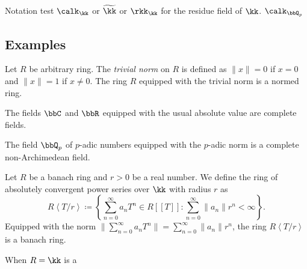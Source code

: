     Notation test \(\calk_\kk\) or \(\widetilde{\kk}\) or \(\rkk_\kk\) for the residue field of \(\kk\).
    \(\calk_{\bbQ_p}\)


\subsection{Examples}

    \begin{example}\label{eg:trivial_normed_rings}
        Let \(R\) be arbitrary ring.
        The \emph{trivial norm} on \(R\) is defined as \(\|x\| = 0\) if \(x = 0\) and \(\|x\| = 1\) if \(x \neq 0\).
        The ring \(R\) equipped with the trivial norm is a normed ring.
    \end{example}

    \begin{example}\label{eg:C_and_R_as_complete_fields}
        The fields \(\bbC\) and \(\bbR\) equipped with the usual absolute value are complete fields.
    \end{example}

    \begin{example}\label{eg:p-adic_fields_as_complete_fields}
        The field \(\bbQ_p\) of \(p\)-adic numbers equipped with the \(p\)-adic norm is a complete non-Archimedean field.
    \end{example}

    \begin{example}\label{eg:ring_of_absolutely_convergent_power_series_as_banach_rings}
        Let \(R\) be a banach ring and \(r > 0\) be a real number.
        We define the ring of absolutely convergent power series over \(\kk\) with radius \(r\) as
        \[ R\left<T/r\right> \coloneqq \left\{\sum_{n=0}^{\infty} a_n T^n \in R[[T]] : \sum_{n=0}^{\infty} \|a_n\| r^n < \infty \right\}. \]
        Equipped with the norm \(\|\sum_{n=0}^{\infty} a_n T^n\| = \sum_{n=0}^{\infty} \|a_n\| r^n\), the ring \(R\left<T/r\right>\) is a banach ring.

        When \(R = \kk\) is a 
    \end{example}

